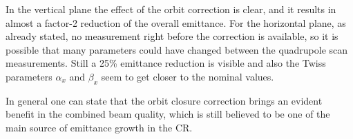 %
In the vertical plane the effect of the orbit correction is clear, and
it results in almost a factor-2 reduction of the overall emittance.
For the horizontal plane, as already stated, no measurement right
before the correction is available, so it is possible that many
parameters could have changed between the quadrupole scan measurements.
Still a 25\% emittance reduction is visible and also the Twiss
parameters $\alpha_x$ and $\beta_x$ seem to get closer to the nominal
values. 

In general one can state that the orbit closure correction brings an
evident benefit in the combined beam quality, which is still believed
to be one of the main source of emittance growth in the CR.









